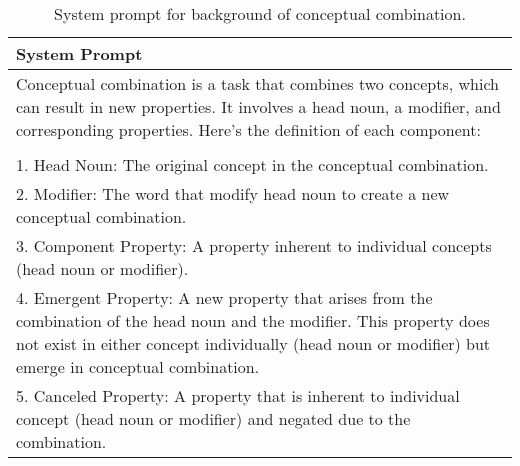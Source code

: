 \begin{table*}[htbp]
\scriptsize
\centering
\begin{tabular}{@{}p{\linewidth}@{}}
\toprule
\textbf{System Prompt}\\
\midrule
Conceptual combination is a task that combines two concepts, which can result in new properties. It involves a head noun, a modifier, and corresponding properties. Here's the definition of each component:\\
\\
1. Head Noun: The original concept in the conceptual combination.\\
2. Modifier: The word that modify head noun to create a new conceptual combination.\\
3. Component Property: A property inherent to individual concepts (head noun or modifier).\\
4. Emergent Property: A new property that arises from the combination of the head noun and the modifier. This property does not exist in either concept individually (head noun or modifier) but emerge in conceptual combination.\\
5. Canceled Property: A property that is inherent to individual concept (head noun or modifier) and negated due to the combination.\\
\bottomrule
\end{tabular}
    \caption{System prompt for background of conceptual combination.}
    \label{tab:prompt_system}
\end{table*}